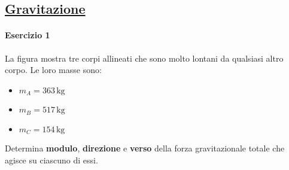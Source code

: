 \subsection*{\hyperref[sec:gravitazione]{Gravitazione}}\label{ex:gravitazione}
\paragraph{Esercizio 1}
La figura mostra tre corpi allineati che sono molto lontani da qualsiasi altro corpo. Le loro masse 
sono:
\begin{itemize}[label={$\bullet$}]
  \item $m_A = 363\,\text{kg}$
  \item $m_B = 517\,\text{kg}$
  \item $m_C = 154\,\text{kg}$
\end{itemize}
Determina \textbf{modulo}, \textbf{direzione} e \textbf{verso} della forza gravitazionale totale 
che agisce su ciascuno di essi.
\begin{center}
\end{center}
\divisor

